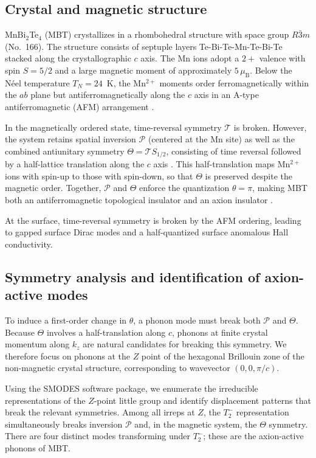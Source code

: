 \documentclass[galley,aps,pra,10pt,amsmath,amssymb,
    superscriptaddress,nofootinbib,longbibliography]{revtex4-2}
\newcounter{comm}
\newcommand{\code}[1]{\textsc{#1}}
\begin{document}
\subsection{Crystal and magnetic structure}

MnBi$_2$Te$_4$ (MBT) crystallizes in a rhombohedral structure with space group $R\bar{3}m$ (No.~166).
The structure consists of septuple layers Te-Bi-Te-Mn-Te-Bi-Te stacked along the crystallographic $c$ axis.
The Mn ions adopt a $2+$ valence with spin $S = 5/2$ and a large magnetic moment of approximately $5\,\mu_\text{B}$.
Below the N\'eel temperature $T_N = 24$~K, the Mn$^{2+}$ moments order ferromagnetically within the $ab$ plane but antiferromagnetically along the $c$ axis in an A-type antiferromagnetic (AFM) arrangement \cite{Yan2019}.

In the magnetically ordered state, time-reversal symmetry $\mathcal{T}$ is broken.
However, the system retains spatial inversion $\mathcal{P}$ (centered at the Mn site) as well as the combined antiunitary symmetry $\Theta = \mathcal{T} S_{1/2}$, consisting of time reversal followed by a half-lattice translation along the $c$ axis \cite{mong2010}.
This half-translation maps Mn$^{2+}$ ions with spin-up to those with spin-down, so that $\Theta$ is preserved despite the magnetic order.
Together, $\mathcal{P}$ and $\Theta$ enforce the quantization $\theta = \pi$, making MBT both an antiferromagnetic topological insulator and an axion insulator \cite{Turner2012}.

At the surface, time-reversal symmetry is broken by the AFM ordering, leading to gapped surface Dirac modes and a half-quantized surface anomalous Hall conductivity.

\subsection{Symmetry analysis and identification of axion-active modes}

To induce a first-order change in $\theta$, a phonon mode must break both $\mathcal{P}$ and $\Theta$.
Because $\Theta$ involves a half-translation along $c$, phonons at finite crystal momentum along $k_z$ are natural candidates for breaking this symmetry.
We therefore focus on phonons at the $Z$ point of the hexagonal Brillouin zone of the non-magnetic crystal structure, corresponding to wavevector $(0,0,\pi/c)$.

Using the \code{SMODES} software package, we enumerate the irreducible representations of the $Z$-point little group and identify displacement patterns that break the relevant symmetries.
Among all irreps at $Z$, the $T_2^-$ representation simultaneously breaks inversion $\mathcal{P}$ and, in the magnetic system, the $\Theta$ symmetry.
There are four distinct modes transforming under $T_2^-$; these are the axion-active phonons of MBT.
\end{document}
